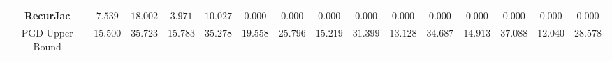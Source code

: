 \begin{table*}
{\begin{tabular}{c|c|c|c|c|c|c|c|c|c|c|c|c|c|c}
     RecurJac &       $7.539$ &      $18.002$ &       $3.971$ &      $10.027$ &       $0.000$ &       $0.000$ &       $0.000$ &       $0.000$ &       $0.000$ &       $0.000$ &       $0.000$ &       $0.000$ &       $0.000$ &       $0.000$ \\
\hline
PGD Upper Bound &      $15.500$ &      $35.723$ &      $15.783$ &      $35.278$ &      $19.558$ &      $25.796$ &      $15.219$ &      $31.399$ &      $13.128$ &      $34.687$ &      $14.913$ &      $37.088$ &      $12.040$ &      $28.578$ \\
\bottomrule

    \end{tabular}
    }
    \label{tab:exp-A-cifar10-radius-robust-acc}
\end{table*}

